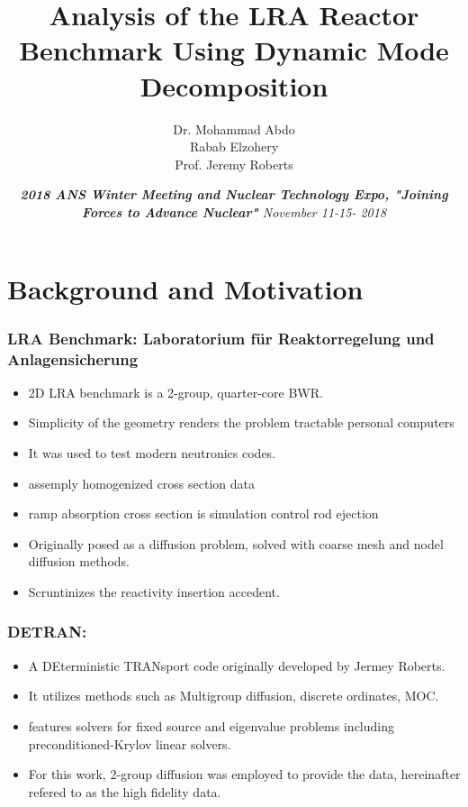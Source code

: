 \documentclass[fleqn]{beamer}
\title[]{
    Analysis of the LRA Reactor Benchmark Using Dynamic Mode Decomposition}
\author[]{
Dr. Mohammad Abdo \\
	       Rabab Elzohery \\
               Prof. Jeremy Roberts}
\institute[Kansas State University]{
    Mechanical and Nuclear Engineering \\
    Kansas State University}
\date[]{\emph{{\textbf{2018 ANS Winter Meeting and Nuclear Technology Expo, "Joining Forces to Advance Nuclear"}}
    November 11-15- 2018}}
\begin{document}
    \newcommand{\beginbackup}{
        \newcounter{framenumbervorappendix}
        \setcounter{framenumbervorappendix}{\value{framenumber}}
    }
    \newcommand{\backupend}{
        \addtocounter{framenumbervorappendix}{-\value{framenumber}}
        \addtocounter{framenumber}{\value{framenumbervorappendix}} 
    }
    
    \begin{frame}
        \titlepage
    \end{frame}
    

    \section{Background and Motivation}
    
    \begin{frame}
        \frametitle{LRA Benchmark: Laboratorium f{\"u}r Reaktorregelung und Anlagensicherung}       
\begin{itemize}
       \item 2D LRA benchmark is a 2-group, quarter-core BWR.
       \item Simplicity of the geometry renders the problem tractable personal computers
   
       \item  It was used to test modern neutronics codes.
%         
    \item assemply homogenized cross section data
    
    \item ramp absorption cross section is simulation control rod ejection
    \item Originally posed as a diffusion problem, solved with coarse mesh and nodel diffusion methods.
    \item Scruntinizes the reactivity insertion accedent. 
       
  
       \end{itemize}
    \end{frame}

    
    \begin{frame}
        \frametitle{DETRAN:}       
\begin{itemize}
       \item A DEterministic TRANsport code originally developed by Jermey Roberts.
       \item It utilizes methods such as Multigroup diffusion, discrete ordinates, MOC.
       \item features solvers for fixed source and eigenvalue problems including preconditioned-Krylov linear solvers. 
%         
    \item For this work, 2-group diffusion was employed to provide the data, hereinafter refered to as the high fidelity data.
       
  
       \end{itemize}
    \end{frame}
\end{document}

